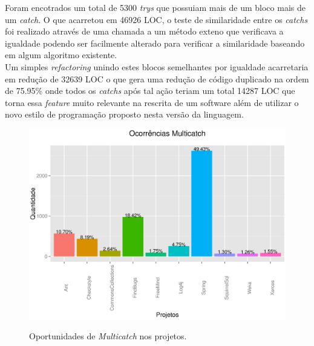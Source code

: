 Foram encotrados um total de 5300 \textit{trys} que possuiam mais de um bloco mais de um \textit{catch}. O que acarretou em 46926 LOC, o teste de  similaridade entre os \textit{catchs} foi realizado através de uma chamada a um método exteno que verificava a igualdade podendo ser facilmente alterado para verificar a similaridade baseando em algum algoritmo existente.\\

Um simples \textit{refactoring} unindo estes blocos semelhantes por igualdade acarretaria em redução de 32639 LOC  o que  gera uma redução de código duplicado na ordem de 75.95\% onde todos os \textit{catchs} após tal ação teriam um total 14287 LOC que torna essa \textit{feature} muito relevante na rescrita de um software além de utilizar o novo estilo de programação proposto nesta versão da linguagem.\\

\begin{figure}[h]
	\center
	\includegraphics[width=1.0\textwidth]{Imagens/ocorrenciasMulticatch}
	\label{fig:Muticatch}
	\caption{Oportunidades de \textit{Multicatch} nos projetos.}
\end{figure}


